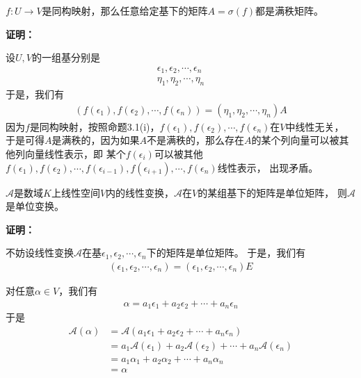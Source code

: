\documentclass{article}
\begin{document}
\begin{zremark}
  $f: U \to V$是同构映射，那么任意给定基下的矩阵$A = \sigma(f)$都是满秩矩阵。
\end{zremark}

\textbf{证明：}

设$U, V$的一组基分别是
\begin{align*}
  \epsilon_1, \epsilon_2, \cdots, \epsilon_n \\
  \eta_1, \eta_2, \cdots, \eta_n
\end{align*}
于是，我们有
\begin{align*}
  (f(\epsilon_1), f(\epsilon_2), \cdots, f(\epsilon_n)) = (\eta_1, \eta_2, \cdots, \eta_n) A
\end{align*}
因为$f$是同构映射，按照命题3.1(i)，$f(\epsilon_1), f(\epsilon_2), \cdots, f(\epsilon_n)$在$V$中线性无关，
于是可得$A$是满秩的，因为如果$A$不是满秩的，那么存在$A$的某个列向量可以被其他列向量线性表示，即
某个$f(\epsilon_i)$可以被其他
$f(\epsilon_1), f(\epsilon_2), \cdots, f(\epsilon_{i-1}), f(\epsilon_{i+1}), \cdots, f(\epsilon_n)$线性表示，
出现矛盾。

\begin{zremark}
  $\mathscr{A}$是数域$K$上线性空间$V$内的线性变换，$\mathscr{A}$在$V$的某组基下的矩阵是单位矩阵，
  则$\mathscr{A}$是单位变换。
\end{zremark}

\textbf{证明：}

不妨设线性变换$\mathscr{A}$在基$\epsilon_1, \epsilon_2, \cdots, \epsilon_n$下的矩阵是单位矩阵。
于是，我们有
\begin{align*}
  (\epsilon_1, \epsilon_2, \cdots, \epsilon_n) = (\epsilon_1, \epsilon_2, \cdots, \epsilon_n) E
\end{align*}

对任意$\alpha \in V$，我们有
\begin{align*}
  \alpha = a_1 \epsilon_1 + a_2 \epsilon_2 + \cdots + a_n \epsilon_n
\end{align*}
于是
\begin{align*}
  \mathscr{A} (\alpha) & = \mathscr{A} (a_1 \epsilon_1 + a_2 \epsilon_2 + \cdots + a_n \epsilon_n) \\
                       & = a_1 \mathscr{A} (\epsilon_1) + a_2 \mathscr{A} (\epsilon_2) + \cdots + a_n \mathscr{A} (\epsilon_n) \\
                       & = a_1 \alpha_1 + a_2 \alpha_2 + \cdots + a_n \alpha_n \\
                       & = \alpha
\end{align*}
\end{document}
